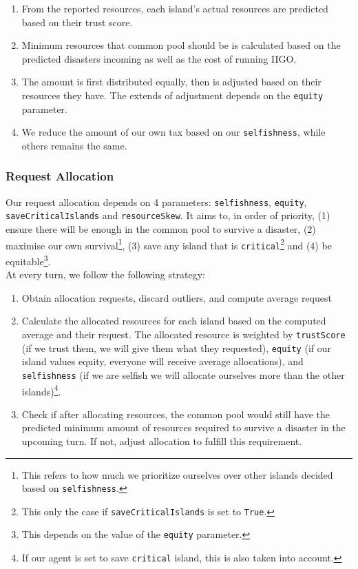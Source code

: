 \documentclass{article}
\begin{document}
\begin{enumerate}
    \item From the reported resources, each island's actual resources are predicted based on their trust score.
    \item Minimum resources that common pool should be is calculated based on the predicted disasters incoming as well as the cost of running IIGO.
    \item The amount is first distributed equally, then is adjusted based on their resources they have. The extends of adjustment depends on the \texttt{equity} parameter.
    \item We reduce the amount of our own tax based on our \texttt{selfishness}, while others remains the same.
\end{enumerate}

\subsubsection*{Request Allocation}
Our request allocation depends on 4 parameters: \texttt{selfishness}, \texttt{equity}, \texttt{saveCriticalIslands} and \texttt{resourceSkew}. It aims to, in order of priority, (1) ensure there will be enough in the common pool to survive a disaster, (2) maximise our own survival\footnote{This refers to how much we prioritize ourselves over other islands decided based on \texttt{selfishness}.}, (3) save any island that is \texttt{critical}\footnote{This only the case if \texttt{saveCriticalIslands} is set to \texttt{True}.} and (4) be equitable\footnote{This depends on the value of the \texttt{equity} parameter.}. \\

At every turn, we follow the following strategy:

\begin{enumerate}
    \item Obtain allocation requests, discard outliers, and compute average request
    \item Calculate the allocated resources for each island based on the computed average and their request. The allocated resource is weighted by  \texttt{trustScore} (if we trust them, we will give them what they requested), \texttt{equity} (if our island values equity, everyone will receive average allocations), and \texttt{selfishness} (if we are selfish we will allocate ourselves more than the other islands)\footnote{If our agent is set to save \texttt{critical} island, this is also taken into account.}. 
    \item Check if after allocating resources, the common pool would still have the predicted minimum amount of resources required to survive a disaster in the upcoming turn. If not, adjust allocation to fulfill this requirement. 
\end{enumerate}
\end{document}
